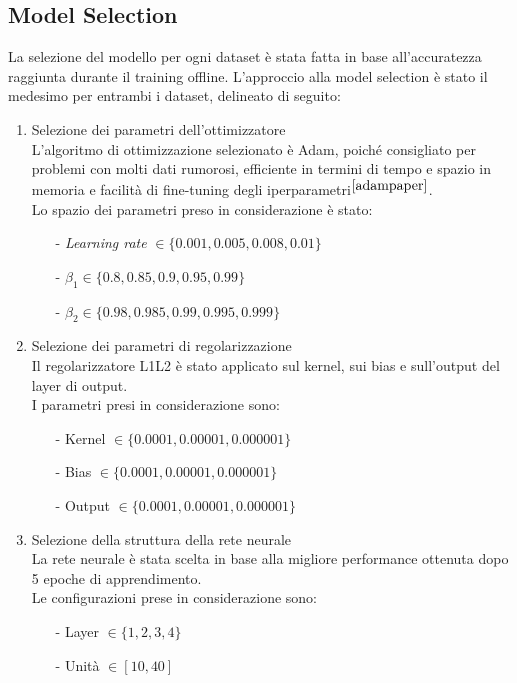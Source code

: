 \subsection{Model Selection}
La selezione del modello per ogni dataset è stata fatta in base all'accuratezza raggiunta durante il training offline. L'approccio alla model selection è stato il medesimo per entrambi i dataset, delineato di seguito:
\begin{enumerate}
    \item Selezione dei parametri dell'ottimizzatore\\
    L'algoritmo di ottimizzazione selezionato è Adam, poiché consigliato per problemi con molti dati rumorosi, efficiente in termini di tempo e spazio in memoria e facilità di fine-tuning degli iperparametri$^{\cite{adampaper}}$.\\
    Lo spazio dei parametri preso in considerazione è stato:
    \begin{itemize}
        \item[-] \textit{Learning rate} $\in \{0.001, 0.005, 0.008, 0.01\}$
        \item[-] $\beta_1 \in \{0.8, 0.85, 0.9, 0.95, 0.99\}$
        \item[-] $\beta_2 \in \{0.98, 0.985, 0.99, 0.995, 0.999\}$
    \end{itemize}
    \item Selezione dei parametri di regolarizzazione\\
    Il regolarizzatore L1L2 è stato applicato sul kernel, sui bias e sull'output del layer di output.\\
    I parametri presi in considerazione sono:
    \begin{itemize}
        \item[-] Kernel $\in \{0.0001, 0.00001, 0.000001\}$
        \item[-] Bias $\in \{0.0001, 0.00001, 0.000001\}$
        \item[-] Output $\in \{0.0001, 0.00001, 0.000001\}$
    \end{itemize}
    \item Selezione della struttura della rete neurale\\
    La rete neurale è stata scelta in base alla migliore performance ottenuta dopo 5 epoche di apprendimento.\\
    Le configurazioni prese in considerazione sono:
    \begin{itemize}
        \item[-] Layer $\in \{1, 2, 3, 4\}$
        \item[-] Unità $\in [10, 40]$
    \end{itemize}
\end{enumerate}

